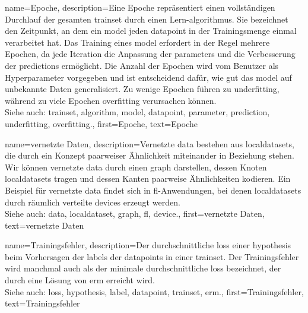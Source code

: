 {{{{
{name={Epoche},
description={Eine Epoche repräsentiert einen vollständigen Durchlauf der gesamten \gls{trainset} durch einen Lern-\gls{algorithmus}. Sie bezeichnet
 den Zeitpunkt, an dem ein \gls{model} jeden \gls{datapoint} in der Trainingsmenge einmal verarbeitet hat. Das Training eines \gls{model} erfordert in 
 der Regel mehrere Epochen, da jede Iteration die Anpassung der \glspl{parameter} und die Verbesserung der \glspl{prediction} ermöglicht. Die Anzahl 
 der Epochen wird vom Benutzer als Hyperparameter vorgegeben und ist entscheidend dafür, wie gut das \gls{model} auf unbekannte Daten generalisiert. 
 Zu wenige Epochen führen zu \gls{underfitting}, während zu viele Epochen \gls{overfitting} verursachen können.
\\
Siehe auch: \gls{trainset}, \gls{algorithm}, \gls{model}, \gls{datapoint}, \gls{parameter}, \gls{prediction}, \gls{underfitting}, \gls{overfitting}.},
first={Epoche},
text={Epoche}
}

{name={vernetzte Daten},
description={Vernetzte \gls{data} bestehen aus \glspl{localdataset}, die durch ein Konzept paarweiser Ähnlichkeit miteinander in Beziehung stehen. Wir können vernetzte \gls{data} durch einen \gls{graph} darstellen, dessen Knoten \glspl{localdataset} tragen und dessen Kanten paarweise Ähnlichkeiten kodieren. Ein Beispiel für vernetzte \gls{data} findet sich in \gls{fl}-Anwendungen, bei denen \glspl{localdataset} durch räumlich verteilte \glspl{device} erzeugt werden.
\\
Siehe auch: \gls{data}, \gls{localdataset}, \gls{graph}, \gls{fl}, \gls{device}.}, 
first={vernetzte Daten},
text={vernetzte Daten}  
}

{name={Trainingsfehler},
description={Der durchschnittliche \gls{loss} einer \gls{hypothesis} beim Vorhersagen der \glspl{label} der \glspl{datapoint} in einer \gls{trainset}. Der Trainingsfehler wird manchmal auch als der minimale durchschnittliche \gls{loss} bezeichnet, der durch eine Lösung von \gls{erm} erreicht wird.
\\
Siehe auch: \gls{loss}, \gls{hypothesis}, \gls{label}, \gls{datapoint}, \gls{trainset}, \gls{erm}.},
first={Trainingsfehler},
text={Trainingsfehler}  
}


}}}}
